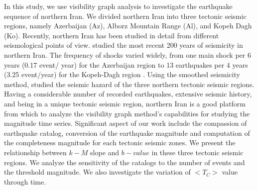 In this study, we use visibility graph analysis to investigate the earthquake sequence of northern Iran. We divided northern Iran into three tectonic seismic regions, namely Azerbaijan (Az), Alborz Mountain Range (Al), and Kopeh Dagh (Ko).  Recently, northern Iran has been studied in detail from different seismological points of view.  \citet{Nemati2015} studied the most recent 200 years of seismicity in northern Iran. The frequency of shocks varied widely, from one main shock per 6 years (0.17 event/ year) for the Azerbaijan region to 13 earthquakes per 4 years (3.25 event/year) for the Kopeh-Dagh region \citep{Nemati2015}. Using the smoothed seismicity method, \citet{Khoshnevis2016} studied the seismic hazard of the three northern tectonic seismic regions. Having a considerable number of recorded earthquakes, extensive seismic history, and being in a unique tectonic seismic region, northern Iran is a good platform from which to analyze the visibility graph method's capabilities for studying the magnitude time series. Significant aspect of our work include the compassion of earthquake catalog, conversion of the earthquake magnitude and computation of the completeness magnitude for each tectonic seismic zones. We present the relationship between  $k-M$  slope and $b-value$  in these three tectonic seismic regions. We analyze the sensitivity of the catalogs to the number of events and the threshold magnitude. We also investigate the variation of  $<T_C>$  value through time. 



